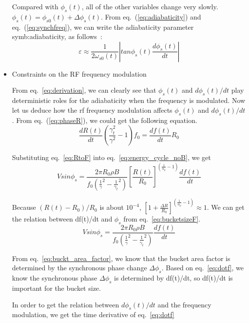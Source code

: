\begin{itemize}
Compared with $\phi_s(t)$, all of the other variables change very slowly. $\phi_s(t)=\phi_{s0}(t)+\Delta\phi_s(t)$. From eq.~(\ref{eq:adiabaticity}) and eq.~(\ref{eq:synchfreq}), we can write the adiabaticity parameter \gls{symb:adiabaticity}, as follows~\cite{ezura_beam-dynamics_2008}:
\begin{equation}
\varepsilon \approx \frac{1}{2\omega_{s0}(t)}|tan\phi_{s}(t)\frac{d\phi_s(t)}{dt}|
\label{eq:derivation}
\end{equation} 

\item Constraints on the RF frequency modulation

From eq.~\ref{eq:derivation}, we can clearly see that $\phi_s(t)$ and $d\phi_s(t)/dt$ play deterministic roles for the adiabaticity when the frequency is modulated. Now let us deduce how the rf frequency modulation affects $\phi_s(t)$ and $d\phi_s(t)/dt$. From eq.~(\ref{eq:phaseR}), we could get the following equation.
\begin{equation}
\frac{dR(t)}{dt}(\frac{\gamma_t^2}{\gamma^2}-1)f_0=\frac{df(t)}{dt} R_0
\label{eq:RtoF}
\end{equation}


Substituting eq.~\ref{eq:RtoF} into eq.~\ref{eq:energy_cycle_noB}, we get
\begin{equation}
Vsin\phi_s=\frac{2\pi R_0 \rho B}{f_0(\frac{1}{\gamma}^2-\frac{1}{\gamma_t}^2)}[\frac{R(t)}{R_0}]^{(\frac{1}{\alpha_p}-1)}\frac{df(t)}{dt} 
\label{eq:bucketsizeF}
\end{equation}

Because $(R(t)-R_0)/R_0$ is about $10^{-4}$, $[1+\frac{\Delta R}{R_0}]^{(\frac{1}{\alpha_p}-1)}\approx 1$. We can get the relation between df(t)/dt and $\phi_s$ from eq.~\ref{eq:bucketsizeF}.
\begin{equation}
Vsin\phi_s=\frac{2\pi R_0 \rho B}{f_0(\frac{1}{\gamma}^2-\frac{1}{\gamma_t}^2)}\frac{df(t)}{dt} 
\label{eq:dotf}
\end{equation}

From eq.~\ref{eq:buckt_area_factor}, we know that the bucket area factor is determined by the synchronous phase change $\Delta\phi_s$. Based on eq.~\ref{eq:dotf}, we know the synchronous phase $\Delta\phi_s$ is determined by df(t)/dt, so df(t)/dt is important for the bucket size.

In order to get the relation between $d\phi_s(t)/dt$ and the frequency modulation, we get the time derivative of eq.~\ref{eq:dotf}


\end{itemize}
